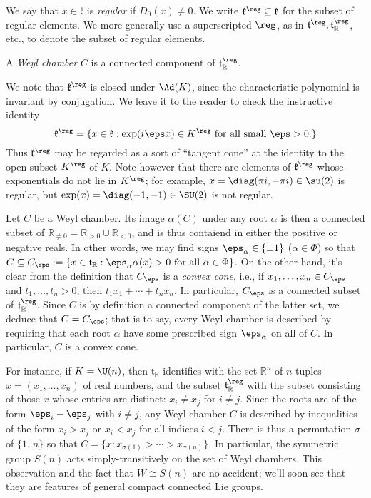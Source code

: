 \documentclass[reqno]{amsart} 
\begin{document}
\begin{definition}
  We say that $x \in \mathfrak{k}$ is \emph{regular} if $D_0(x) \neq 0$.  We write $\mathfrak{k}^{\reg} \subseteq \mathfrak{k}$ for the subset of regular elements.  We more generally use a superscripted $\reg$, as in $\mathfrak{t}^{\reg}, \mathfrak{t}_{\mathbb{R}}^{\reg}$, etc., to denote the subset of regular elements.

  A \emph{Weyl chamber} $C$ is a connected component of $\mathfrak{t}_{\mathbb{R}}^{\reg}$.
\end{definition}

We note that $\mathfrak{k}^{\reg}$ is closed under $\Ad(K)$, since the characteristic polynomial is invariant by conjugation.  We leave it to the reader to check the instructive identity
\begin{equation*}
  \mathfrak{k}^{\reg} = \{ x \in \mathfrak{k} : \exp(i \eps x) \in K^{\reg} \text{ for all small } \eps > 0.  \}
\end{equation*}
Thus $\mathfrak{k}^{\reg}$ may be regarded as a sort of ``tangent cone'' at the identity to the open subset $K^{\reg}$ of $K$.  Note however that there are elements of $\mathfrak{k}^{\reg}$ whose exponentials do not lie in $K^{\reg}$; for example, $x = \diag(\pi i, - \pi i ) \in \su(2)$ is regular, but $\exp(x) = \diag(-1,-1) \in \SU(2)$ is not regular.

Let $C$ be a Weyl chamber.  Its image $\alpha(C)$ under any root $\alpha$ is then a connected subset of $\mathbb{R}_{ \neq 0} = \mathbb{R}_{>0} \cup \mathbb{R}_{<0}$, and is thus contaiend in either the positive or negative reals.  In other words, we may find signs $\eps_{\alpha} \in \{\pm 1\}$ ($\alpha \in \Phi$) so that $C \subseteq C_\eps := \{x \in \mathfrak{t}_{\mathbb{R}} : \eps_\alpha \alpha(x) > 0 \text{ for all } \alpha \in \Phi \}$.  On the other hand, it's clear from the definition that $C_{\eps}$ is a \emph{convex cone}, i.e., if $x_1,\dotsc,x_n \in C_{\eps}$ and $t_1,\dotsc,t_n > 0$, then $t_1 x_1 + \dotsb + t_n x_n$.  In particular, $C_{\eps}$ is a connected subset of $\mathfrak{t}_{\mathbb{R}}^{\reg}$.  Since $C$ is by definition a connected component of the latter set, we deduce that $C = C_{\eps}$; that is to say, every Weyl chamber is described by requiring that each root $\alpha$ have some prescribed sign $\eps_{\alpha}$ on all of $C$.  In particular, $C$ is a convex cone.

For instance, if $K = \U(n)$, then $\mathfrak{t}_{\mathbb{R}}$ identifies with the set $\mathbb{R}^n$ of $n$-tuples $x = (x_1,\dotsc,x_n)$ of real numbers, and the subset $\mathfrak{t}_{\mathbb{R}}^{\reg}$ with the subset consisting of those $x$ whose entries are distinct: $x_i \neq x_j$ for $i \neq j$.  Since the roots are of the form $\eps_i - \eps_j$ with $i \neq j$, any Weyl chamber $C$ is described by inequalities of the form $x_i > x_j$ or $x_i < x_j$ for all indices $i < j$.  There is thus a permutation $\sigma$ of $\{1..n\}$ so that $C = \{ x : x_{\sigma(1)} > \dotsb > x_{\sigma(n)} \}$.  In particular, the symmetric group $S(n)$ acts simply-transitively on the set of Weyl chambers.  This observation and the fact that $W \cong S(n)$ are no accident; we'll soon see that they are features of general compact connected Lie groups.
\end{document}
